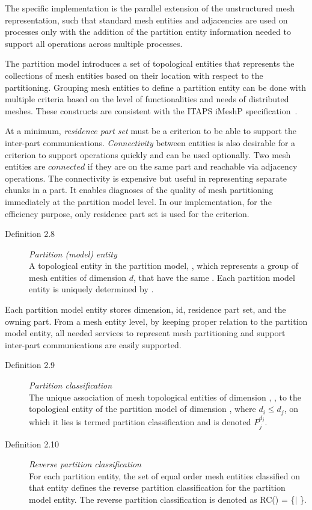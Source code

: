 The specific implementation is the parallel extension of the unstructured mesh representation, such that standard mesh entities and adjacencies are used on processes only with the addition of the partition entity information needed to support all operations across multiple processes.

The partition model introduces a set of topological entities that represents the collections of mesh entities based on their location with
respect to the partitioning. Grouping mesh entities to define a partition entity
can be done with multiple criteria based on the level of functionalities and needs of distributed meshes. These constructs are consistent with the ITAPS iMeshP specification~\cite{itapsweb}.

At a minimum, \emph{residence part set} must be a criterion to be
able to support the inter-part communications. \emph{Connectivity} between entities is also desirable for a criterion to
support operations quickly and can be used optionally. Two mesh entities are $connected$ if they are on the same part and reachable via adjacency operations. The  connectivity is expensive but useful in representing separate  chunks in a part. It enables diagnoses of the quality of mesh partitioning immediately at the partition model level. In our implementation, for the efficiency purpose, only residence part set is used for the criterion. 

\begin{description}
\item[Definition 2.8] \emph{Partition (model) entity}\\
A topological entity in the partition model, \Pdi, which
represents a group of mesh entities of dimension $d$, that have the
same \RP. Each partition model entity is uniquely determined by \RP. 
\end{description}

Each partition model entity stores dimension, id, residence part set, and
the owning part. From a mesh entity level, by keeping proper relation to the
partition model entity, all needed services to represent mesh partitioning and support
inter-part communications are easily supported. 

\begin{description}
\item[Definition 2.9] \emph{Partition classification}\\
The unique association of mesh topological entities of dimension \di, \Mdii, to the topological entity of the
partition model of dimension \djj, \Pdjjb where $d_i \le d_j$, on which it lies is termed partition
classification and is denoted \Mdiib\clasb $P^{d_j}_j$.

\item[Definition 2.10] \emph{Reverse partition classification}\\
For each partition entity, the set of equal order mesh entities classified on that
entity defines the reverse partition classification for the partition model
entity. The reverse partition classification
is denoted as RC(\Pdj) = \{\Mdib $\mid$ \Mdib\clasb\Pdj\}. 
\end{description}

